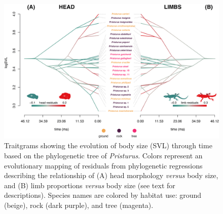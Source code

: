 \documentclass[
  11pt,
]{article}
\providecommand{\DIFaddbeginFL}{} %
\providecommand{\DIFaddendFL}{} %
\providecommand{\DIFdelbeginFL}{} %
\providecommand{\DIFdelendFL}{} %
\newcommand{\DIFscaledelfig}{0.5}
\newlength{\DIFdelgraphicswidth} %
\newlength{\DIFdelgraphicsheight} %
\newcommand{\DIFaddincludegraphics}[2][]{{\color{blue}\fbox{\DIFOincludegraphics[#1]{#2}}}} %
\newcommand{\DIFdelincludegraphics}[2][]{%
\sbox{\DIFdelgraphicsbox}{\DIFOincludegraphics[#1]{#2}}%
\settoboxwidth{\DIFdelgraphicswidth}{\DIFdelgraphicsbox} %
\settoboxtotalheight{\DIFdelgraphicsheight}{\DIFdelgraphicsbox} %
\scalebox{\DIFscaledelfig}{%
\parbox[b]{\DIFdelgraphicswidth}{\usebox{\DIFdelgraphicsbox}\\[-\baselineskip] \rule{\DIFdelgraphicswidth}{0em}}\llap{\resizebox{\DIFdelgraphicswidth}{\DIFdelgraphicsheight}{%
\setlength{\unitlength}{\DIFdelgraphicswidth}%
\begin{picture}(1,1)%
\thicklines\linethickness{2pt} %
{\color[rgb]{1,0,0}\put(0,0){\framebox(1,1){}}}%
{\color[rgb]{1,0,0}\put(0,0){\line( 1,1){1}}}%
{\color[rgb]{1,0,0}\put(0,1){\line(1,-1){1}}}%
\end{picture}%
}\hspace*{3pt}}} %
} %
\DeclareRobustCommand{\DIFaddbeginFL}{\DIFOaddbeginFL \let\includegraphics\DIFaddincludegraphics} %
\DeclareRobustCommand{\DIFaddendFL}{\DIFOaddendFL \let\includegraphics\DIFOincludegraphics} %
\DeclareRobustCommand{\DIFdelbeginFL}{\DIFOdelbeginFL \let\includegraphics\DIFdelincludegraphics} %
\DeclareRobustCommand{\DIFdelendFL}{\DIFOaddendFL \let\includegraphics\DIFOincludegraphics} %
\begin{document}
\begin{figure}

{\centering \includegraphics[width=1\linewidth]{Figs/figure_3_Pristurus_allometry_traitgram_legends} 

}

\caption{Traitgrams showing the evolution of body size (SVL) through time based on the phylogenetic tree of \textit{Pristurus}. Colors represent an evolutionary mapping of residuals from phylogenetic regressions describing the relationship of (A) head morphology \textit{versus} body size, and (B) limb proportions \textit{versus} body size (see text for descriptions). Species names are colored by habitat use: ground (beige), rock (dark purple), and tree (magenta).}\DIFdelbeginFL %
\DIFdelendFL \DIFaddbeginFL \label{fig:unnamed-chunk-7}
\DIFaddendFL \end{figure}

\newpage
\end{document}
